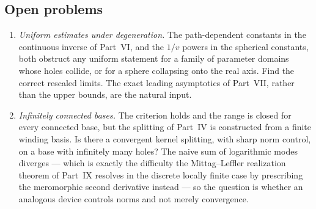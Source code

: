 \documentclass[11pt,a4paper]{article}
\numberwithin{equation}{section}
\theoremstyle{definition}
\theoremstyle{remark}
\theoremstyle{plain}
\begin{document}
\subsection{Open problems}
\label{f:sub:open}

\begin{enumerate}[label=\textup{(O\arabic*)}]
\item \emph{Uniform estimates under degeneration.} The path-dependent
constants in the continuous inverse of Part~VI, and the $1/v$ powers in the
spherical constants, both obstruct any uniform statement for a family of
parameter domains whose holes collide, or for a sphere collapsing onto the
real axis. Find the correct rescaled limits. The exact leading asymptotics
of Part~VII, rather than the upper bounds, are the natural input.
\item \emph{Infinitely connected bases.} The criterion holds and the range
is closed for every connected base, but the splitting of Part~IV is
constructed from a finite winding basis. Is there a convergent kernel
splitting, with sharp norm control, on a base with infinitely many holes?
The naive sum of logarithmic modes diverges --- which is exactly the
difficulty the Mittag--Leffler realization theorem of Part~IX resolves in
the discrete locally finite case by prescribing the meromorphic second
derivative instead --- so the question is whether an analogous device
controls norms and not merely convergence.


\end{enumerate}
\end{document}
